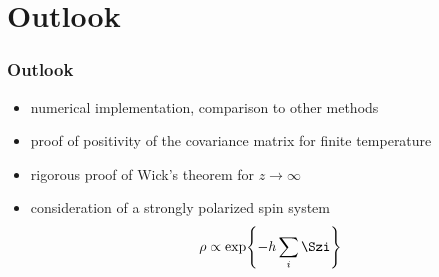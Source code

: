 \section{Outlook}

\begin{frame}
	\frametitle{ Outlook }
	\begin{itemize}
        \item numerical implementation, comparison to other methods
		\item proof of positivity of the covariance matrix for finite temperature
		\item rigorous proof of Wick's theorem for $z\to\infty$
		\item consideration of a strongly polarized spin system
		\begin{align*}
			\rho \propto \exp{ -h \sum_{i} \Szi}
		\end{align*}
	\end{itemize}
\end{frame}